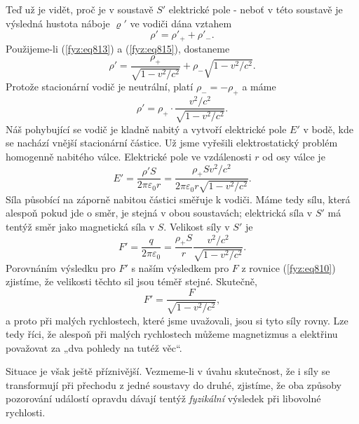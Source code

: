     Teď už je vidět, proč je v soustavě \(S'\) elektrické pole - neboť v této soustavě je výsledná
    hustota náboje \(\varrho'\) ve vodiči dána vztahem
    \begin{equation*}
      ρ′=ρ′_++ρ′_−.
    \end{equation*}
    Použijeme-li (\ref{fyz:eq813}) a (\ref{fyz:eq815}), dostaneme
    \begin{equation*}
      ρ′=\dfrac{ρ_+}{\sqrt{1−v^2/c^2}}+ ρ_−\sqrt{1−v^2/c^2}.
    \end{equation*}
    Protože stacionární vodič je neutrální, platí \(ρ_−=−ρ_+\) a máme
    \begin{equation}\label{fyz:eq816}
      ρ′=ρ_+\cdot\dfrac{v^2/c^2}{\sqrt{1−v^2/c^2}}.
    \end{equation}
    Náš pohybující se vodič je kladně nabitý a vytvoří elektrické pole \(E'\) v bodě, kde se nachází
    vnější stacionární částice. Už jsme vyřešili elektrostatický problém homogenně nabitého válce.
    Elektrické pole ve vzdálenosti \(r\) od osy válce je
    \begin{equation}\label{fyz:eq817}
      E′=\dfrac{ρ′S}{2π\varepsilon_0r} = \dfrac{ρ_+Sv^2/c^2}{2π\varepsilon_0r\sqrt{1−v^2/c^2}}.
    \end{equation}
    Síla působící na záporně nabitou částici směřuje k vodiči. Máme tedy sílu, která alespoň pokud
    jde o směr, je stejná v obou soustavách; elektrická síla v \(S'\) má tentýž směr jako magnetická
    síla v \(S\). Velikost síly v \(S'\) je 
    \begin{equation}\label{fyz:eq818}
      F′=\dfrac{q}{2π\varepsilon_0} = \dfrac{ρ_+S}{r}\dfrac{v^2/c^2}{\sqrt{1−v^2/c^2}}.
    \end{equation}
    Porovnáním výsledku pro \(F'\) s naším výsledkem pro \(F\) z rovnice (\ref{fyz:eq810}) zjistíme,
    že velikosti těchto sil jsou téměř stejné. Skutečně,
    \begin{equation}\label{fyz:eq819}
      F′=\dfrac{F}{\sqrt{1−v^2/c^2}},
    \end{equation}
    a proto při malých rychlostech, které jsme uvažovali, jsou si tyto síly rovny. Lze tedy říci, že
    alespoň při malých rychlostech můžeme magnetizmus a elektřinu považovat za „dva pohledy na tutéž
    věc“.

    Situace je však ještě příznivější. Vezmeme-li v úvahu skutečnost, že i síly se transformují při
    přechodu z jedné soustavy do druhé, zjistíme, že oba způsoby pozorování událostí opravdu dávají
    tentýž \emph{fyzikální} výsledek při libovolné rychlosti.

